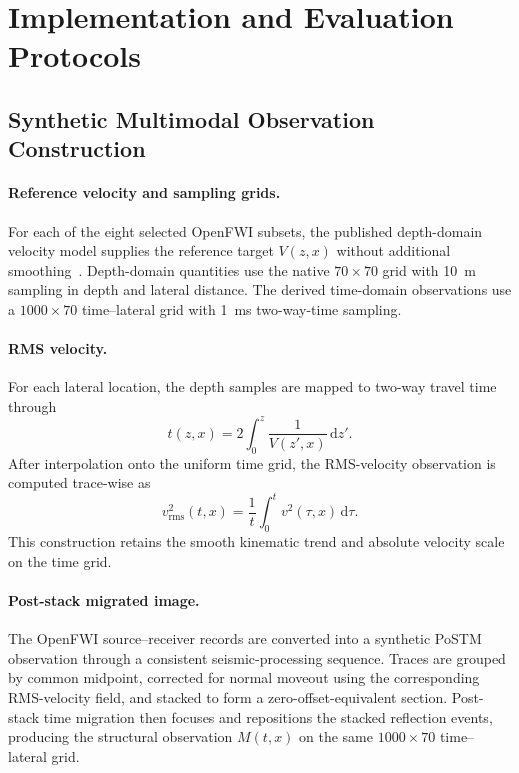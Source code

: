 \section{Implementation and Evaluation Protocols}
\label{app:implementation}
\subsection{Synthetic Multimodal Observation Construction}
\paragraph{Reference velocity and sampling grids.}
For each of the eight selected OpenFWI subsets, the published depth-domain velocity model supplies the reference target $V(z,x)$ without additional smoothing~\cite{deng2022openfwi}. Depth-domain quantities use the native $70\times70$ grid with 10~m sampling in depth and lateral distance. The derived time-domain observations use a $1000\times70$ time--lateral grid with 1~ms two-way-time sampling.

\paragraph{RMS velocity.}
For each lateral location, the depth samples are mapped to two-way travel time through
\begin{equation}
t(z,x)=2\int_0^z\frac{1}{V(z',x)}\,\mathrm{d}z'.
\label{eq:rms-twt-construction}
\end{equation}
After interpolation onto the uniform time grid, the RMS-velocity observation is computed trace-wise as~\cite{dix1955velocities}
\begin{equation}
v_{\mathrm{rms}}^2(t,x)=\frac{1}{t}\int_0^t v^2(\tau,x)\,\mathrm{d}\tau.
\label{eq:rms-observation-construction}
\end{equation}
This construction retains the smooth kinematic trend and absolute velocity scale on the time grid.

\paragraph{Post-stack migrated image.}
The OpenFWI source--receiver records are converted into a synthetic PoSTM observation through a consistent seismic-processing sequence. Traces are grouped by common midpoint, corrected for normal moveout using the corresponding RMS-velocity field, and stacked to form a zero-offset-equivalent section. Post-stack time migration then focuses and repositions the stacked reflection events, producing the structural observation $M(t,x)$ on the same $1000\times70$ time--lateral grid.

